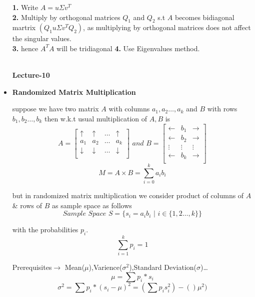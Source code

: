 \documentclass[a4paper]{article}
\numberwithin{equation}{section}
\begin{document}
\begin{itemize}
\textbf{1.} Write $A=u\Sigma v^T$ \\
\textbf{2.} Multiply by orthogonal matrices $Q_1$ and $Q_2$ s.t $A$ becomes bidiagonal martrix $(Q_1u\Sigma v^T Q_2)$, as multiplying by orthogonal matrices does not affect the singular values.\\
\textbf{3.} hence $A^TA$ will be tridiagonal
\textbf{4.} Use Eigenvalues method.\\
\\
\begin{center}
    \textbf{\Huge{Lecture-10}}
\end{center}

\item \textbf{Randomized Matrix Multiplication}

suppose we have two matrix $A$ with columns $a_1,a_2\dots,a_k$ and $B$ with rows $b_1,b_2\dots,b_k$ then w.k.t usual multiplication of $A,B$ is 
\[A=\begin{bmatrix}
    \uparrow &\uparrow &\dots&\uparrow\\
    a_1&a_2&\dots&a_k\\
    \downarrow &\downarrow &\dots&\downarrow\\
\end{bmatrix} \hspace{4pt}and \hspace{4pt} B=\begin{bmatrix}
    \leftarrow&b_1&\rightarrow\\
    \leftarrow&b_2&\rightarrow\\
    \vdots&\vdots&\vdots\\
    \leftarrow&b_k&\rightarrow\\
\end{bmatrix}\]
\[M=A\times B=\sum_{i=0}^{k}a_ib_i\]

but in randomized matrix multiplication we consider product of columns of $A$ \& rows of $B$ as sample space as follows 
\[Sample \hspace{4pt} Space \hspace{4pt} S=\{s_i=a_ib_i\hspace{4pt} | \hspace{4pt} i\in \{1,2\dots,k\}\}\]

with the probabilities $p_i$.
\[\sum_{i=1}^{k}p_i=1\]

Prerequisites$\longrightarrow$ Mean($\mu$),Varience($\sigma^2$),Standard Deviation($\sigma$)\dots
\[\mu =\sum p_i*s_i\]
\[\sigma^2=\sum p_i*(s_i-\mu)^2=\left(\sum p_is_i^2\right)-()\mu^2)\]


\end{itemize}
\end{document}
